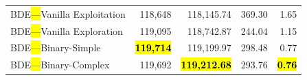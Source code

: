 \documentclass[mathematics,article,accept,moreauthors]{Definitions/mdpi}
\begin{document}
\begin{table}[H]
\begin{tabularx}{\textwidth}{lRRRR}
    \midrule
    BDE\hl{---}Vanilla Exploitation  &         118,648 &        118,145.74 & 369.30 &         1.65 \\
    BDE\hl{---}Vanilla Exploration   &         119,095 &        118,742.87 & 244.04 &         1.15 \\
    BDE\hl{---}Binary-Simple         & \textbf{\hl{119,714}} &        119,199.97 & 298.48 &         0.77 \\
    BDE\hl{---}Binary-Complex        &         119,692 & \textbf{\hl{119,212.68}} & 293.76 & \textbf{\hl{0.76}} \\
    \bottomrule
  \end{tabularx}
\end{table}

\vspace{-9pt}

\end{document}
